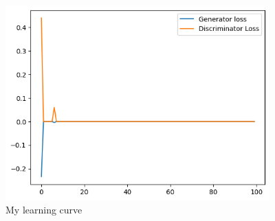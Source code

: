 \documentclass[a4paper]{article}
\theoremstyle{definition}
\newenvironment{soln}{
	\leavevmode\color{blue}\ignorespaces
}{}
\begin{document}
\begin{enumerate} [label=(\alph*)]
		\begin{soln}
			\begin{figure}[H]
				\centering
				\includegraphics[width=4in]{1b_curve.png}
				\caption{My learning curve}
				\label{fig:gan_q1_loss}
			\end{figure}
			

\end{soln}
\end{enumerate}
\end{document}

